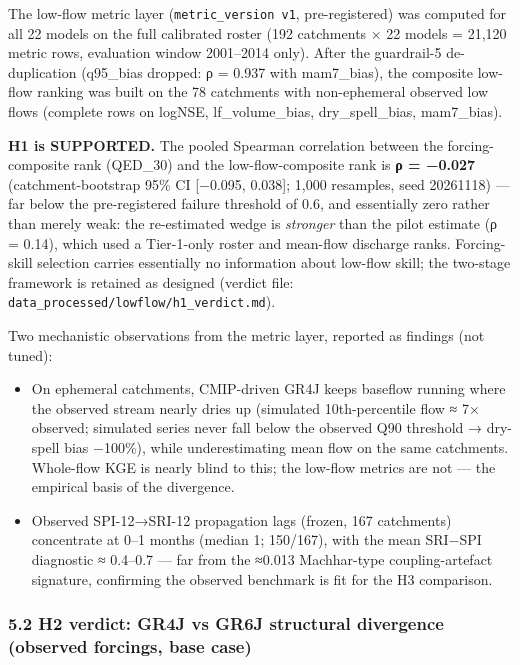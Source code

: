 \documentclass[
  english,
  11pt,
]{article}
\providecommand{\tightlist}{%
  \setlength{\itemsep}{0pt}\setlength{\parskip}{0pt}}
\begin{document}
The low-flow metric layer (\texttt{metric\_version\ v1}, pre-registered)
was computed for all 22 models on the full calibrated roster (192
catchments × 22 models = 21,120 metric rows, evaluation window
2001--2014 only). After the guardrail-5 de-duplication (q95\_bias
dropped: ρ = 0.937 with mam7\_bias), the composite low-flow ranking was
built on the 78 catchments with non-ephemeral observed low flows
(complete rows on logNSE, lf\_volume\_bias, dry\_spell\_bias,
mam7\_bias).

\textbf{H1 is SUPPORTED.} The pooled Spearman correlation between the
forcing-composite rank (QED\_30) and the low-flow-composite rank is
\textbf{ρ = −0.027} (catchment-bootstrap 95\% CI {[}−0.095, 0.038{]};
1,000 resamples, seed 20261118) --- far below the pre-registered failure
threshold of 0.6, and essentially zero rather than merely weak: the
re-estimated wedge is \emph{stronger} than the pilot estimate (ρ =
0.14), which used a Tier-1-only roster and mean-flow discharge ranks.
Forcing-skill selection carries essentially no information about
low-flow skill; the two-stage framework is retained as designed (verdict
file: \texttt{data\_processed/lowflow/h1\_verdict.md}).

Two mechanistic observations from the metric layer, reported as findings
(not tuned):

\begin{itemize}
\tightlist
\item
  On ephemeral catchments, CMIP-driven GR4J keeps baseflow running where
  the observed stream nearly dries up (simulated 10th-percentile flow ≈
  7× observed; simulated series never fall below the observed Q90
  threshold → dry-spell bias −100\%), while underestimating mean flow on
  the same catchments. Whole-flow KGE is nearly blind to this; the
  low-flow metrics are not --- the empirical basis of the divergence.
\item
  Observed SPI-12→SRI-12 propagation lags (frozen, 167 catchments)
  concentrate at 0--1 months (median 1; 150/167), with the mean
  \textbar SRI−SPI\textbar{} diagnostic ≈ 0.4--0.7 --- far from the
  ≈0.013 Machhar-type coupling-artefact signature, confirming the
  observed benchmark is fit for the H3 comparison.
\end{itemize}

\subsubsection{5.2 H2 verdict: GR4J vs GR6J structural divergence
(observed forcings, base
case)}\label{h2-verdict-gr4j-vs-gr6j-structural-divergence-observed-forcings-base-case}
\end{document}
